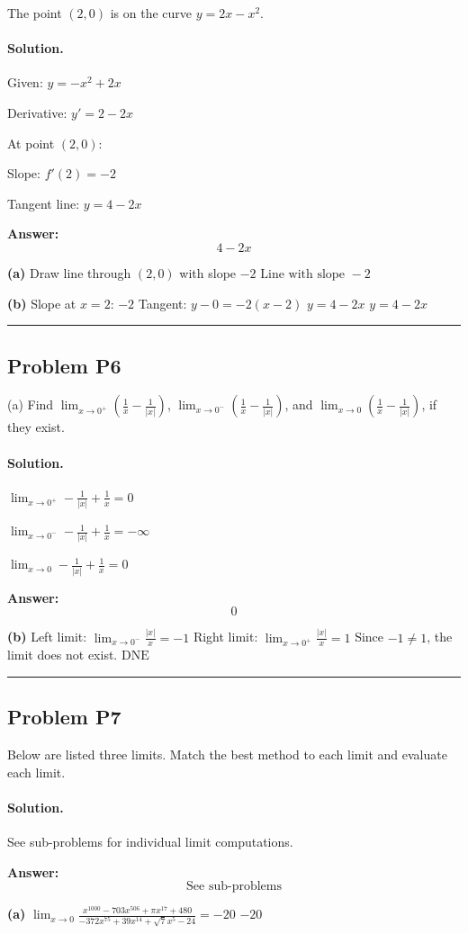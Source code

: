 \documentclass[12pt, a4paper]{article}
\newcommand{\problem}[1]{\subsection*{Problem #1}}
\newcommand{\solution}{\paragraph{Solution.}}
\begin{document}
The point $(2, 0)$ is on the curve $y = 2x - x^2$.

\solution

Given: $y = - x^{2} + 2 x$

Derivative: $y' = 2 - 2 x$

At point $(2, 0)$:

Slope: $f'(2) = -2$

Tangent line: $y = 4 - 2 x$

\textbf{Answer:}
\[\boxed{4 - 2 x}\]

\textbf{(a)}
Draw line through $(2, 0)$ with slope $-2$
$\boxed{\text{Line with slope } -2}$

\textbf{(b)}
Slope at $x=2$: $-2$
Tangent: $y - 0 = -2(x - 2)$
$y = 4 - 2 x$
$\boxed{y = 4 - 2 x}$

\vspace{1em}
\hrule
\vspace{1em}

\problem{P6}

(a) Find $\lim_{x \to 0^+}\left(\frac{1}{x} - \frac{1}{|x|}\right)$, $\lim_{x \to 0^-}\left(\frac{1}{x} - \frac{1}{|x|}\right)$, and $\lim_{x \to 0}\left(\frac{1}{x} - \frac{1}{|x|}\right)$, if they exist.

\solution

$\lim_{x \to 0^+} - \frac{1}{\left|{x}\right|} + \frac{1}{x} = 0$

$\lim_{x \to 0^-} - \frac{1}{\left|{x}\right|} + \frac{1}{x} = -\infty$

$\lim_{x \to 0} - \frac{1}{\left|{x}\right|} + \frac{1}{x} = 0$

\textbf{Answer:}
\[\boxed{0}\]

\textbf{(b)}
Left limit: $\lim_{x \to 0^-} \frac{\left|{x}\right|}{x} = -1$
Right limit: $\lim_{x \to 0^+} \frac{\left|{x}\right|}{x} = 1$
Since $-1 \neq 1$, the limit does not exist.
$\boxed{\text{DNE}}$

\vspace{1em}
\hrule
\vspace{1em}

\problem{P7}

Below are listed three limits. Match the best method to each limit and evaluate each limit.

\solution

See sub-problems for individual limit computations.

\textbf{Answer:}
\[\boxed{\text{See sub-problems}}\]

\textbf{(a)}
$\lim_{x \to 0} \frac{x^{1000} - 703 x^{506} + \pi x^{17} + 480}{- 372 x^{75} + 39 x^{14} + \sqrt{7} x^{5} - 24} = -20$
$\boxed{-20}$
\end{document}
